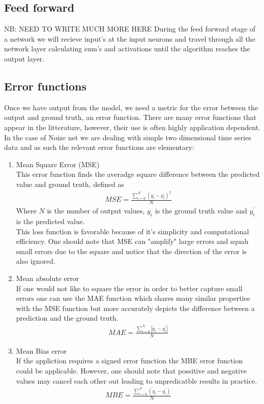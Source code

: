 \documentclass{article}
\begin{document}
\label{sec:activationfuncs}

\subsection{Feed forward}
\label{sec:forward}
NB: NEED TO WRITE MUCH MORE HERE
During the feed forward stage of a network we will recieve input's at the input neurons and travel through all the network layer calculating sum's and activations until the algorithm reaches the output layer.
\subsection{Error functions}
\label{sec:error}
Once we have output from the model, we need a metric for the error between the output and ground truth, an error function. There are many error functions that appear in the litterature, however, their use is often highly application dependent. In the case of Noize net we are dealing with simple two dimensional time series data and as such the relevant error functions are elementary:
\begin{enumerate}
\item Mean Square Error (MSE)\\
This error function finds the averadge square difference between the predicted value and ground truth, defined as
\begin{align*}
MSE = \frac{\sum_{i=0}^N (y_i - y_i^\prime)^2}{N}
\end{align*}
Where $N$ is the number of output values, $y_i$ is the ground truth value and $y_i^\prime$ is the predicted value. \\
This loss function is favorable because of it's simplicity and computational efficiency. One should note that MSE can "amplify" large errors and squah small errors due to the square and notice that the direction of the error is also ignored.  
\item Mean absolute error \\
If one would not like to square the error in order to better capture small errors one can use the MAE function which shares many similar properties with the MSE function but more accurately depicts the difference between a prediction and the ground truth. 
\begin{align*}
MAE = \frac{\sum_{i=0}^N |y_i - y_i^\prime|}{N}
\end{align*}
\item Mean Bias error \\
If the appliction requires a signed error function the MBE error function could be applicable. However, one should note that possitive and negative values may cancel each other out leading to unpredicatble results in practice. 
\begin{align*}
MBE = \frac{\sum_{i=0}^N (y_i - y_i^\prime)}{N}
\end{align*}
\end{enumerate}
\end{document}
